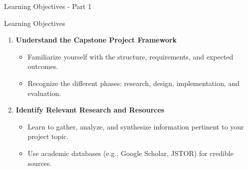 \documentclass[aspectratio=169]{beamer}
\begin{document}
\begin{frame}[fragile]{Learning Objectives - Part 1}
    \begin{block}{Learning Objectives}
        \begin{enumerate}
            \item \textbf{Understand the Capstone Project Framework}
            \begin{itemize}
                \item Familiarize yourself with the structure, requirements, and expected outcomes.
                \item Recognize the different phases: research, design, implementation, and evaluation.
            \end{itemize}
            
            \item \textbf{Identify Relevant Research and Resources}
            \begin{itemize}
                \item Learn to gather, analyze, and synthesize information pertinent to your project topic.
                \item Use academic databases (e.g., Google Scholar, JSTOR) for credible sources.
            \end{itemize}
        \end{enumerate}
    \end{block}
\end{frame}
\end{document}
